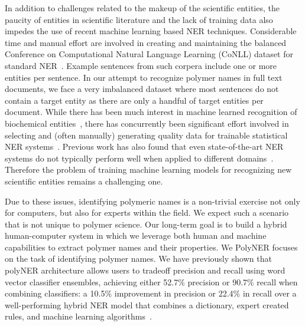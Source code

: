 In addition to challenges related to the makeup of the scientific entities, the paucity of entities in scientific literature and the lack of training data also impedes the use of recent machine learning based NER techniques.
Considerable time and manual effort are involved in creating and maintaining the balanced
Conference on Computational Natural Language Learning (CoNLL) dataset for standard NER~\cite{tjong2003introduction}.
Example sentences from such corpera include one or more entities per sentence. 
In our attempt to recognize polymer names in full text documents, we face a very imbalanced dataset where most sentences do not contain a target entity as there are only a handful of target entities per document.
While there has been much interest in machine learned recognition of biochemical entities~\cite{jessop2011oscar4,rocktaschel2012chemspot,leaman2015tmchem,swain2016chemdataextractor}, there has concurrently been significant effort involved in selecting and (often manually) generating quality data for
trainable statistical NER systems~\cite{krallinger2015chemdner}. 
Previous work has also found that even state-of-the-art NER systems do
not typically perform well when applied to different domains~\cite{krallinger2013overview}. 
Therefore the problem of training machine learning models for recognizing new scientific entities remains a challenging one.

Due to these issues, identifying polymeric names is a non-trivial exercise not only for computers, but also for experts within the field. 
We expect such a scenario that is not unique to polymer science.
Our long-term goal is to build a hybrid human-computer system in which we leverage both 
human and machine capabilities to extract polymer names and their properties. 
We 
PolyNER focuses on the task of identifying polymer names. 
We have previously shown that polyNER architecture allows users to tradeoff precision and recall using word vector classifier ensembles, achieving
either 52.7\% precision or 90.7\% recall when combining classifiers:
a 10.5\% improvement in precision or 22.4\% in recall over a well-performing hybrid NER model
that combines a dictionary, expert created rules, and machine learning algorithms~\cite{active}. 
